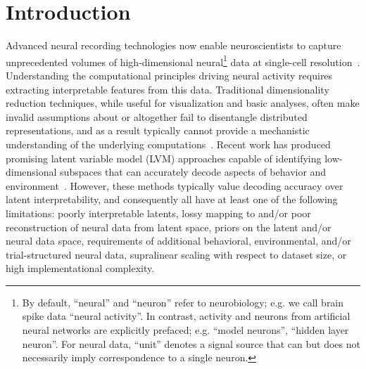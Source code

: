 \section{Introduction}

Advanced neural recording technologies now enable neuroscientists to capture unprecedented volumes of high-dimensional neural\footnote{\fontsize{8}{8}\selectfont By default, ``neural'' and ``neuron'' refer to neurobiology; e.g. we call brain spike data ``neural activity''. In contrast, activity and neurons from artificial neural networks are explicitly prefaced; e.g. ``model neurons'', ``hidden layer neuron''. For neural data, ``unit'' denotes a signal source that can but does not necessarily imply correspondence to a single neuron.} data at single-cell resolution~\citep{steinmetz_2021_neuropixels2, raducanu_2017_neuroseeker, cai_2016_miniscope, villette_2019_voltage_2p, ouzounov_2017_three_photon, ahrens_2013_lightsheet}. Understanding the computational principles driving neural activity requires extracting interpretable features from this data. Traditional dimensionality reduction techniques, while useful for visualization and basic analyses, often make invalid assumptions about or altogether fail to disentangle distributed representations, and as a result typically cannot provide a mechanistic understanding of the underlying computations~\citep{cunningham_2014_neural_dr, humphries_2021_dr_principles}. Recent work has produced promising latent variable model (LVM) approaches capable of identifying low-dimensional subspaces that can accurately decode aspects of behavior and environment~\citep{song_2025_langevinflow, schneider_2023_cebra, le_2022_stndt, keshtkaran_2022_autolfads, yu_2009_gpfa, macke_2011_plds, gao_2016_pflds, low_2018_mind, jensen_2020_mgplvm, hernandez_2020_vind, kim_2021_plnde, hurwitz_2021_tndm, schimel_2022_ilqrvae, kudryashova_2023_ctrltndm, ye_2023_ndt2, gondur_2024_mmgpvae, pellegrino_2024_slicetca, sani_2024_dpad, pals_2024_smclr_rnn, zhang_2024_mtm, george_2025_simpl, perkins_2025_mint, schmutz_2025_nce}. However, these methods typically value decoding accuracy over latent interpretability, and consequently all have at least one of the following limitations: poorly interpretable latents, lossy mapping to and/or poor reconstruction of neural data from latent space, priors on the latent and/or neural data space, requirements of additional behavioral, environmental, and/or trial-structured neural data, supralinear scaling with respect to dataset size, or high implementational complexity.

